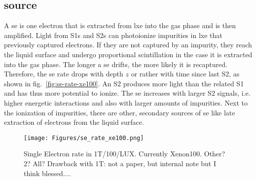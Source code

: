 
\FloatBarrier
\subsection{source}
\label{ssec:se-source}
\FloatBarrier


A \gls{se} is one electron that is extracted from \gls{lxe} into the gas phase and is then amplified.
Light from S1s and S2s can photoionize impurities in \gls{lxe} that previously captured electrons.
If they are not captured by an impurity, they reach the liquid surface and undergo proportional scintillation in the case it is extracted into the gas phase.
The longer a \gls{se} drifts, the more likely it is recaptured.
Therefore, the \gls{se} rate drops with depth $ z $ or rather with time since last S2, as shown in fig.~\ref{fig:se-rate-xe100}.  %
An S2 produces more light than the related S1 and has thus more potential to ionize.
The \gls{se} increases with larger S2 signals, i.e. higher energetic interactions and also with larger amounts of impurities\cite{}.  %
Next to the ionization of impurities, there are other, secondary sources of \gls{se} like late extraction of electrons from the liquid surface.


\begin{figure}
    \centering
    \texttt{[image: Figures/se\_rate\_xe100.png]}  %
    \caption[Single Electron Rate in 1T/100/LUX]{
        Single Electron rate in 1T/100/LUX. Currently Xenon100. Other? 2? All? Drawback with 1T: not a paper, but internal note but I think blessed...\cite{Aprile2014}.
    }
    \label{fig:se-rate}
\end{figure}




